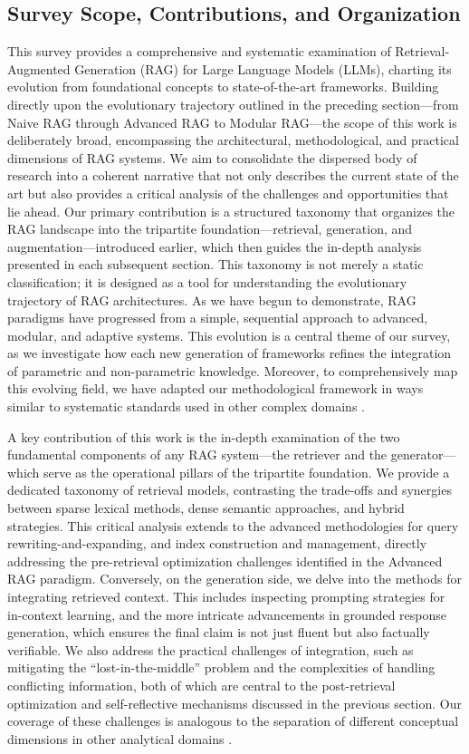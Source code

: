 \documentclass[11pt]{article}
\begin{document}
\subsection{Survey Scope, Contributions, and Organization}

This survey provides a comprehensive and systematic examination of Retrieval-Augmented Generation (RAG) for Large Language Models (LLMs), charting its evolution from foundational concepts to state-of-the-art frameworks. Building directly upon the evolutionary trajectory outlined in the preceding section---from Naive RAG through Advanced RAG to Modular RAG---the scope of this work is deliberately broad, encompassing the architectural, methodological, and practical dimensions of RAG systems. We aim to consolidate the dispersed body of research into a coherent narrative that not only describes the current state of the art but also provides a critical analysis of the challenges and opportunities that lie ahead. Our primary contribution is a structured taxonomy that organizes the RAG landscape into the tripartite foundation---retrieval, generation, and augmentation---introduced earlier, which then guides the in-depth analysis presented in each subsequent section. This taxonomy is not merely a static classification; it is designed as a tool for understanding the evolutionary trajectory of RAG architectures. As we have begun to demonstrate, RAG paradigms have progressed from a simple, sequential approach to advanced, modular, and adaptive systems. This evolution is a central theme of our survey, as we investigate how each new generation of frameworks refines the integration of parametric and non-parametric knowledge. Moreover, to comprehensively map this evolving field, we have adapted our methodological framework in ways similar to systematic standards used in other complex domains \cite{ref43}.

A key contribution of this work is the in-depth examination of the two fundamental components of any RAG system---the retriever and the generator---which serve as the operational pillars of the tripartite foundation. We provide a dedicated taxonomy of retrieval models, contrasting the trade-offs and synergies between sparse lexical methods, dense semantic approaches, and hybrid strategies. This critical analysis extends to the advanced methodologies for query rewriting-and-expanding, and index construction and management, directly addressing the pre-retrieval optimization challenges identified in the Advanced RAG paradigm. Conversely, on the generation side, we delve into the methods for integrating retrieved context. This includes inspecting prompting strategies for in-context learning, and the more intricate advancements in grounded response generation, which ensures the final claim is not just fluent but also factually verifiable. We also address the practical challenges of integration, such as mitigating the ``lost-in-the-middle'' problem and the complexities of handling conflicting information, both of which are central to the post-retrieval optimization and self-reflective mechanisms discussed in the previous section. Our coverage of these challenges is analogous to the separation of different conceptual dimensions in other analytical domains \cite{ref44}.
\end{document}
